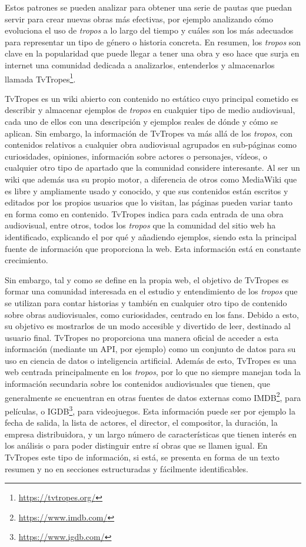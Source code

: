 Estos patrones se pueden analizar para obtener una serie de pautas que puedan
servir para crear nuevas obras más efectivas, por ejemplo analizando cómo
evoluciona el uso de \textit{tropos} a lo largo del tiempo y cuáles son los más
adecuados para representar un tipo de género o historia concreta. En resumen,
los \textit{tropos} son clave en la popularidad que puede llegar a tener una
obra y eso hace que surja en internet una comunidad dedicada a analizarlos,
entenderlos y almacenarlos llamada
TvTropes\footnote{\url{https://tvtropes.org/}}. 

TvTropes es un wiki abierto con contenido no estático cuyo principal cometido es
describir y almacenar ejemplos de \textit{tropos} en cualquier tipo de medio
audiovisual, cada uno de ellos con una descripción y ejemplos reales de dónde y
cómo se aplican. Sin embargo, la información de TvTropes va más allá de los
\textit{tropos}, con contenidos relativos a cualquier obra audiovisual agrupados
en sub-páginas como curiosidades, opiniones, información sobre actores o
personajes, vídeos, o cualquier otro tipo de apartado que la comunidad considere
interesante. Al ser un wiki que además usa su propio motor, a diferencia de
otros como MediaWiki que es libre y ampliamente usado y conocido, y que sus
contenidos están escritos y editados por los propios usuarios que lo visitan,
las páginas pueden variar tanto en forma como en contenido. TvTropes indica para
cada entrada de una obra audiovisual, entre otros, todos los \textit{tropos} que
la comunidad del sitio web ha identificado, explicando el por qué y añadiendo
ejemplos, siendo esta la principal fuente de información que proporciona la web.
Esta información está en constante crecimiento.

Sin embargo, tal y como se define en la propia web, el objetivo de TvTropes es
formar una comunidad interesada en el estudio y entendimiento de los
\textit{tropos} que se utilizan para contar historias y también en cualquier
otro tipo de contenido sobre obras audiovisuales, como curiosidades, centrado en
los fans. Debido a esto, su objetivo es mostrarlos de un modo accesible y
divertido de leer, destinado al usuario final. TvTropes no proporciona una
manera oficial de acceder a esta información (mediante un API, por ejemplo) como
un conjunto de datos para su uso en ciencia de datos o inteligencia artificial.
Además de esto, TvTropes es una web centrada principalmente en los
\textit{tropos}, por lo que no siempre manejan toda la información secundaria
sobre los contenidos audiovisuales que tienen, que generalmente se encuentran en
otras fuentes de datos externas como IMDB\footnote{\url{https://www.imdb.com/}},
para películas, o IGDB\footnote{\url{https://www.igdb.com/}}, para videojuegos.
Esta información puede ser por ejemplo la fecha de salida, la lista de actores,
el director, el compositor, la duración, la empresa distribuidora, y un largo
número de características que tienen interés en los análisis o para poder
distinguir entre sí obras que se llamen igual. En TvTropes este tipo de
información, si está, se presenta en forma de un texto resumen y no en secciones
estructuradas y fácilmente identificables.

